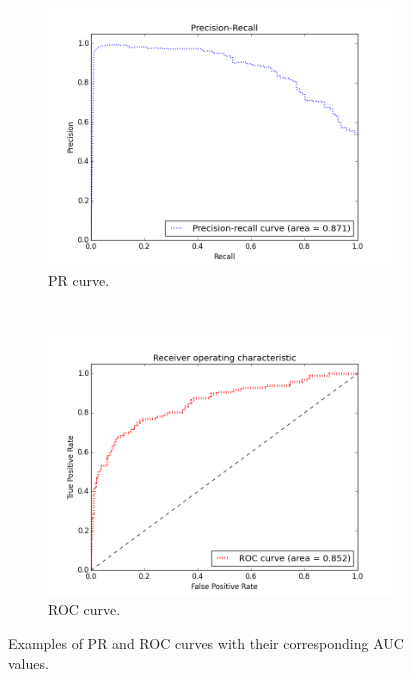 \documentclass[ms]{nuthesis}
\begin{document}
\FloatBarrier
\begin{figure}[!htb]
    \centering
    \begin{subfigure}[t]{0.5\textwidth}
        \centering
        \includegraphics[width=\textwidth]{fig/Psv_1_2_fine_PR}
        \caption{PR curve.}
    \end{subfigure}%
    ~
    \begin{subfigure}[t]{0.5\textwidth}
        \centering
        \includegraphics[width=\textwidth]{fig/Psv_1_2_fine_ROC}
        \caption{ROC curve.}
    \end{subfigure}
    \caption{Examples of PR and ROC curves with their corresponding AUC values.}
    \label{fig:PRRocExamples}
\end{figure}
\FloatBarrier
\end{document}
